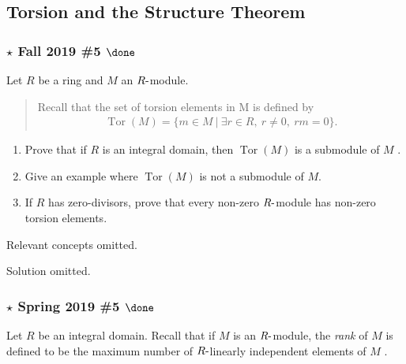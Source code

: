 \hypertarget{torsion-and-the-structure-theorem}{%
\subsection{Torsion and the Structure
Theorem}\label{torsion-and-the-structure-theorem}}

\hypertarget{star-fall-2019-5-done}{%
\subsubsection{\texorpdfstring{\(\star\) Fall 2019 \#5
\(\done\)}{\textbackslash star Fall 2019 \#5 \textbackslash done}}\label{star-fall-2019-5-done}}

Let \(R\) be a ring and \(M\) an \(R{\hbox{-}}\)module.

\begin{quote}
Recall that the set of torsion elements in M is defined by
\begin{align*}
\operatorname{Tor}(M) = \{m \in M {~\mathrel{\Big|}~}\exists r \in R, ~r \neq 0, ~rm = 0\}
.\end{align*}
\end{quote}

\begin{enumerate}
\def\labelenumi{\alph{enumi}.}
\item
  Prove that if \(R\) is an integral domain, then
  \(\operatorname{Tor}(M )\) is a submodule of \(M\) .
\item
  Give an example where \(\operatorname{Tor}(M )\) is not a submodule of
  \(M\).
\item
  If \(R\) has zero-divisors, prove that every non-zero
  \(R{\hbox{-}}\)module has non-zero torsion elements.
\end{enumerate}

Relevant concepts omitted.

Solution omitted.

\hypertarget{star-spring-2019-5-done}{%
\subsubsection{\texorpdfstring{\(\star\) Spring 2019 \#5
\(\done\)}{\textbackslash star Spring 2019 \#5 \textbackslash done}}\label{star-spring-2019-5-done}}

Let \(R\) be an integral domain. Recall that if \(M\) is an
\(R{\hbox{-}}\)module, the \emph{rank} of \(M\) is defined to be the
maximum number of \(R{\hbox{-}}\)linearly independent elements of \(M\)
.

